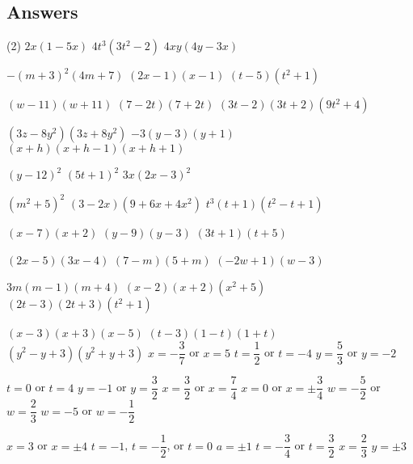 \clearpage

\subsection{Answers}

\begin{tasks}(2)
\task $2x(1 - 5x)$ 
\task $4t^3(3t^2-2)$
\task $4xy(4y-3x)$

\task $-(m+3)^2(4m+7)$
\task $(2x-1)(x-1)$
\task $(t-5)(t^2+1)$

\task $(w-11)(w+11)$
\task $(7-2t)(7+2t)$
\task $(3t-2)(3t+2)(9t^2+4)$

\task $(3z-8y^2)(3z+8y^2)$
\task $-3(y - 3)(y+1)$
\task $(x+h)(x+h-1)(x+h+1)$

\task $(y-12)^2$
\task $(5t+1)^2$
\task $3x(2x-3)^2$

\task $(m^2+5)^2$
\task $(3-2x)(9 + 6x + 4x^2)$
\task $t^3(t+1)(t^2 - t + 1)$

\task $(x-7)(x+2)$
\task $(y-9)(y-3)$
\task $(3t+1)(t+5)$

\task $(2x-5)(3x-4)$
\task $(7-m)(5+m)$
\task $(-2w+1)(w-3)$

\task $3m(m-1)(m+4)$
\task $(x-2)(x+2)(x^2+5)$
\task $(2t-3)(2t+3)(t^2+1)$

\task $(x-3)(x+3)(x-5)$
\task $(t-3)(1-t)(1+t)$
\task $(y^2-y+3)(y^2+y+3)$
\task   $x = -\dfrac{3}{7}$ or $x = 5$ 
\task   $t = \dfrac{1}{2}$ or $t = -4$
\task   $y = \dfrac{5}{3}$ or $y = -2$

\task   $t = 0$ or $t = 4$
\task   $y = -1$ or $y = \dfrac{3}{2}$ 
\task   $x = \dfrac{3}{2}$ or $x = \dfrac{7}{4}$ 
\task $x = 0$ or $x = \pm \dfrac{3}{4}$ 
\task $w = -\dfrac{5}{2}$ or $w = \dfrac{2}{3}$
\task $w=-5$ or $w = -\dfrac{1}{2}$

\task $x=3$ or $x = \pm 4$ 
\task $t = -1$, $t= -\dfrac{1}{2}$, or $t = 0$
\task $a = \pm 1$
\task $t = -\dfrac{3}{4}$ or $t = \dfrac{3}{2}$
\task $x = \dfrac{2}{3}$
\task $y = \pm 3$  

\end{tasks}
